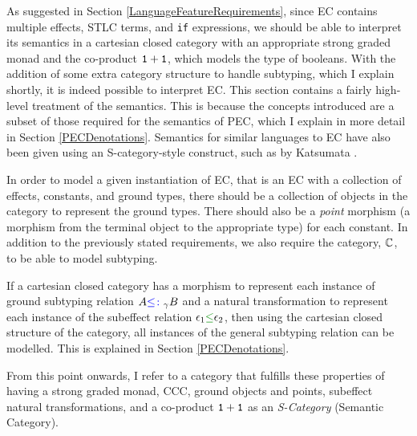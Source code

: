 \documentclass{Report}
\begin{document}
As suggested in Section \ref{LanguageFeatureRequirements}, since EC contains multiple effects, STLC terms, and \texttt{if} expressions, we should be able to interpret its semantics in a cartesian closed category with an appropriate strong graded monad and the co-product $\texttt{1} + \texttt{1}$, which models the type of booleans. With the addition of some extra category structure to handle subtyping, which I explain shortly, it is indeed possible to interpret EC. This section contains a fairly high-level treatment of the semantics. This is because the concepts introduced are a subset of those required for the semantics of PEC, which I explain in more detail in Section \ref{PECDenotations}. Semantics for similar languages to EC have also been given using an S-category-style construct, such as by Katsumata \cite{Katsumata:2014}. 

In order to model a given instantiation of EC, that is an EC with a collection of effects, constants, and ground types, there should be a collection of objects in the category to represent the ground types. There should also be a \textit{point} morphism (a morphism from the terminal object to the appropriate type) for each constant. In addition to the previously stated requirements, we also require the category, $\mathbb{C}$, to be able to model subtyping. 

If a cartesian closed category has a morphism to represent each instance of  ground subtyping relation $A{\color{blue} \leq\colon}_\gamma B$ and a natural transformation to represent each instance of the subeffect relation $\e_1\subeffect \e_2$, then using the cartesian closed structure of the category, all instances of the general subtyping relation can be modelled. This is explained in Section \ref{PECDenotations}.

From this point onwards, I refer to a category that fulfills these properties of having a strong graded monad, CCC, ground objects and points, subeffect natural transformations, and a co-product $\texttt{1} + \texttt{1}$ as an \textit{S-Category} (Semantic Category).
\end{document}
